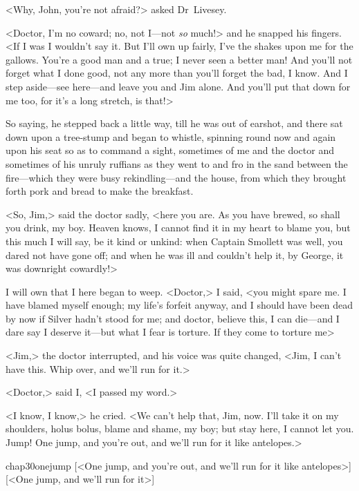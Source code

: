 <Why, John, you're not afraid?> asked Dr~Livesey.

<Doctor, I'm no coward; no, not I—not \textit{so} much!> and he snapped his fingers. <If I was I wouldn't say it. But I'll own up fairly, I've the shakes upon me for the gallows. You're a good man and a true; I never seen a better man! And you'll not forget what I done good, not any more than you'll forget the bad, I know. And I step aside—see here—and leave you and Jim alone. And you'll put that down for me too, for it's a long stretch, is that!>

So saying, he stepped back a little way, till he was out of earshot, and there sat down upon a tree-stump and began to whistle, spinning round now and again upon his seat so as to command a sight, sometimes of me and the doctor and sometimes of his unruly ruffians as they went to and fro in the sand between the fire—which they were busy rekindling—and the house, from which they brought forth pork and bread to make the breakfast.

<So, Jim,> said the doctor sadly, <here you are. As you have brewed, so shall you drink, my boy. Heaven knows, I cannot find it in my heart to blame you, but this much I will say, be it kind or unkind: when Captain Smollett was well, you dared not have gone off; and when he was ill and couldn't help it, by George, it was downright cowardly!>

I will own that I here began to weep. <Doctor,> I said, <you might spare me. I have blamed myself enough; my life's forfeit anyway, and I should have been dead by now if Silver hadn't stood for me; and doctor, believe this, I can die—and I dare say I deserve it—but what I fear is torture. If they come to torture me\longdash>

<Jim,> the doctor interrupted, and his voice was quite changed, <Jim, I can't have this. Whip over, and we'll run for it.>

<Doctor,> said I, <I passed my word.>

<I know, I know,> he cried. <We can't help that, Jim, now. I'll take it on my shoulders, holus bolus, blame and shame, my boy; but stay here, I cannot let you. Jump! One jump, and you're out, and we'll run for it like antelopes.>

\begin{bwbigpic}
	[\basicscale]
	{chap30onejump}
	[<One jump, and you're out, and we'll run for it like antelopes>]
	[<One jump, and we'll run for it>]
\end{bwbigpic}

